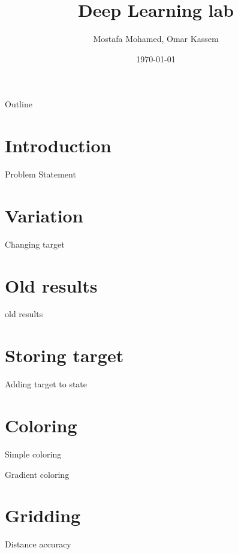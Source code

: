 \documentclass{beamer}
\title[]{Deep Learning lab}
\subtitle{}
\author[Uni-Freiburg]{Mostafa Mohamed, Omar Kassem}
\date{\today}
\institute{Alberts-Ludwig Universt\"at Freiburg}
\begin{document}
\begin{frame}
\titlepage
\end{frame}

\begin{frame}{Outline}
  \setcounter{tocdepth}{1}
  \tableofcontents
\end{frame}

\section{Introduction}
\begin{frame}{Problem Statement}
\end{frame}

\section{Variation}
\begin{frame}{Changing target}
\end{frame}

\section{Old results}
\begin{frame}{old results}
\end{frame}

\section{Storing target}
\begin{frame}{Adding target to state}
\end{frame}

\section{Coloring}
\begin{frame}{Simple coloring}
\end{frame}

\begin{frame}{Gradient coloring}
\end{frame}

\section{Gridding}
\begin{frame}{Distance accuracy}
\end{frame}
\end{document}
